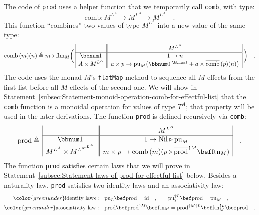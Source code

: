 The code of \lstinline!prod! uses a helper function that we temporarily
call \lstinline!comb!, with type:
\[
\text{comb}:M^{L^{A}}\rightarrow M^{L^{A}}\rightarrow M^{L^{A}}\quad.
\]
This function \textsf{``}combines\textsf{''} two values of type $M^{L^{A}}$ into
a new value of the same type:
\begin{equation}
\text{comb}\,(m)(n)\triangleq m\triangleright\text{flm}_{M}\bigg(\,\begin{array}{|c||c|}
 & M^{L^{A}}\\
\hline \bbnum 1 & 1\rightarrow n\\
A\times M^{L^{A}} & a\times p\rightarrow\text{pu}_{M}\big(\bbnum 0^{:\bbnum 1}+a\times\overline{\text{comb}}\,(p)(n)\big)
\end{array}\,\bigg)\quad.\label{eq:definition-of-comb-for-effectful-list}
\end{equation}
The code uses the monad $M$\textsf{'}s \lstinline!flatMap! method to sequence
all $M$-effects from the first list before all $M$-effects of the
second one. We will show in Statement~\ref{subsec:Statement-monoid-operation-comb-for-effectful-list}
that the \lstinline!comb! function is a monoidal operation for values
of type $T^{A}$; that property will be used in the later derivations.
The function \lstinline!prod! is defined recursively via \lstinline!comb!:
\begin{equation}
\text{prod}\triangleq\,\begin{array}{|c||c|}
 & M^{L^{A}}\\
\hline \bbnum 1 & 1\rightarrow\text{Nil}\triangleright\text{pu}_{M}\\
M^{L^{A}}\times M^{L^{M^{L^{A}}}} & m\times p\rightarrow\text{comb}\,(m)(p\triangleright\overline{\text{prod}}^{\uparrow M}\bef\text{ftn}_{M})
\end{array}\quad.\label{eq:definition-of-prod-for-list-monad-transformer}
\end{equation}
The function \lstinline!prod! satisfies certain laws that we will
prove in Statement~\ref{subsec:Statement-laws-of-prod-for-effectful-list}
below. Besides a naturality law, \lstinline!prod! satisfies two identity
laws
and an associativity
law:
\begin{align}
{\color{greenunder}\text{identity laws}:}\quad & \text{pu}_{L}\bef\text{prod}=\text{id}\quad,\quad\quad\text{pu}_{T}^{\uparrow L}\bef\text{prod}=\text{pu}_{M}\quad,\label{eq:identity-laws-of-prod-for-effectful-list}\\
{\color{greenunder}\text{associativity law}:}\quad & \text{prod}\bef\text{prod}^{\uparrow M}\bef\text{ftn}_{M}=\text{prod}^{\uparrow M\uparrow L}\bef\text{ftn}_{M}^{\uparrow L}\bef\text{prod}\quad.\label{eq:associativity-law-of-prod-for-effectful-list}
\end{align}
